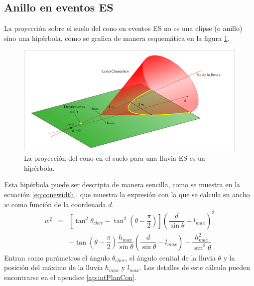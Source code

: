 	\subsection{Anillo \cher{} en eventos ES}
	\label{sbsc:conoEs}
	
	La proyección sobre el suelo del cono \cher{} en eventos ES no es una elipse (o anillo) sino una hipérbola, como se grafica de manera esquem\'atica en la figura \ref{fig:chConeES}.
	\begin{figure}[ht!]
	\centering
		\includegraphics[width=\textwidth]{fig/EASRadio/coneProy}
		\caption{\label{fig:chConeES} La proyección del cono en el suelo para una lluvia ES es ua hip\'erbola.}
	\end{figure}
	Esta hip\'erbola puede ser descripta de manera sencilla, como se muestra en la ecuación \ref{eq:conewidth}, que muestra la expresión con la que se calcula su ancho $w$ como función de la coordenada $d$.
	\begin{equation}
	\renewcommand{\arraystretch}{2.5}
	\begin{array}{rcl}
	w^2&=& \left[\tan^2 \theta_{cher}-\tan^2 \left(\theta-\dfrac{\pi}{2}\right)\right]
	\left(\dfrac{d}{\sin \theta}-l_{max}\right)^2\\
	& & - \tan \left(\theta-\dfrac{\pi}{2}\right) \dfrac{h_{max}}{\sin \theta}
	\left(\dfrac{d}{\sin \theta}-l_{max}\right)
	- \dfrac{h_{max}^2}{\sin^2 \theta}
	\end{array}
	\label{eq:conewidth}
	\end{equation}
	Entran como parámetros el ángulo \cher{} $\theta_{cher}$, el ángulo cenital de la lluvia $\theta$ y la posición del máximo de la lluvia $h_{max}$ y $l_{max}$.
	Los detalles de este cálculo pueden encontrarse en el apendice \ref{ap:intPlanCon}.
	
